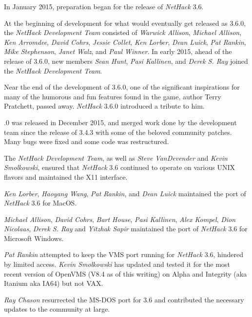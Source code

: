\documentclass[titlepage]{article}
\begin{document}
\medskip
In January 2015, preparation began for the release of \textit{NetHack} 3.6.

\medskip
At the beginning of development for what would eventually get released as
3.6.0, the \textit{NetHack Development Team} consisted of \textit{Warwick Allison},
\textit{Michael Allison}, \textit{Ken Arromdee},
\textit{David Cohrs}, \textit{Jessie Collet},
\textit{Ken Lorber}, \textit{Dean Luick}, \textit{Pat Rankin},
\textit{Mike Stephenson}, \textit{Janet Walz}, and \textit{Paul Winner}.
In early 2015, ahead of the release of 3.6.0, new members
\textit{Sean Hunt}, \textit{Pasi Kallinen}, and \textit{Derek S. Ray}
joined the \textit{NetHack Development Team}.

\medskip
Near the end of the development of 3.6.0, one of the significant inspirations
for many of the humorous and fun features found in the game,
author Terry Pratchett, passed away. \textit{NetHack} 3.6.0 introduced
a tribute to him.

.0 was released in December 2015, and merged work done by the development
team since the release of 3.4.3 with some of the beloved community
patches.  Many bugs were fixed and some code was restructured.

\medskip
The \textit{NetHack Development Team}, as well as \textit{Steve VanDevender} and
\textit{Kevin Smolkowski}, ensured that \textit{NetHack} 3.6 continued to
operate on various UNIX flavors and maintained the X11 interface.

\medskip
\textit{Ken Lorber}, \textit{Haoyang Wang}, \textit{Pat Rankin}, and \textit{Dean Luick}
maintained the port of \textit{NetHack} 3.6 for MacOS.

\medskip
\textit{Michael Allison}, \textit{David Cohrs}, \textit{Bart House},
\textit{Pasi Kallinen}, \textit{Alex Kompel}, \textit{Dion Nicolaas},
\textit{Derek S. Ray} and  \textit{Yitzhak Sapir}
maintained the port of  \textit{NetHack} 3.6 for Microsoft Windows.

\medskip
\textit{Pat Rankin} attempted to keep the VMS port running for \textit{NetHack} 3.6,
hindered by limited access.  \textit{Kevin Smolkowski} has updated and tested it
for the most recent version of OpenVMS (V8.4 as of this writing) on Alpha
and Integrity (aka Itanium aka IA64) but not VAX.

\medskip
\textit{Ray Chason}  resurrected the MS-DOS port for 3.6 and contributed the
necessary updates to the community at large.
\end{document}
